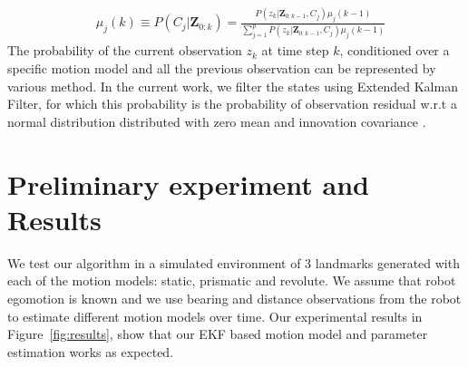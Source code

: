 \documentclass[10pt,twocolumn,letterpaper]{article}
\begin{document}
\begin{align*}
& \mu_j(k) \equiv P(C_j|\mathbf{Z}_{0:k})  = 
  \frac{P(z_k|\mathbf{Z}_{0:k-1}, C_j)\mu_j(k-1)}{\sum_{j=1}^{p} P(z_k|\mathbf{Z}_{0:k-1}, C_j)\mu_j(k-1) }
\end{align*}
The probability of the current observation $z_k$ at time step $k$, conditioned over a specific motion model and all the previous observation can be represented by various method. In the current work, we filter the states using Extended Kalman Filter, for which this probability is the probability of observation residual w.r.t a normal distribution distributed with zero mean and innovation covariance \cite{yaakov2001estimation}.


\section{Preliminary experiment and Results}
We test our algorithm in a simulated environment of 3 landmarks generated with each of the motion models: static, prismatic and revolute. We assume that robot egomotion is known and we use bearing and distance observations from the robot to estimate different motion models over time. 
Our experimental results in Figure~\ref{fig:results}, show that our EKF based motion model and parameter estimation works as expected.

{\small


}
\end{document}
